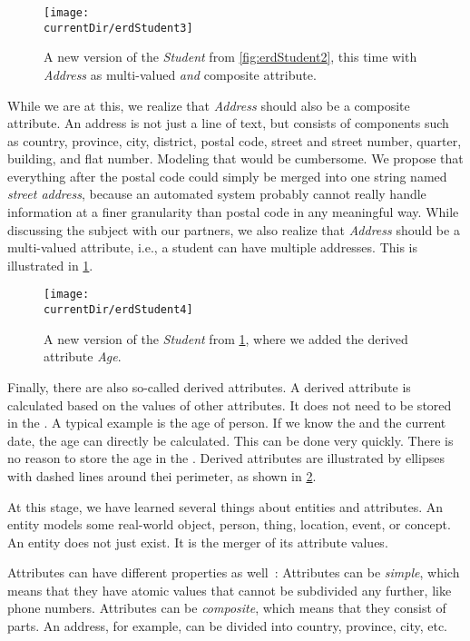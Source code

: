 \begin{figure}%
\centering%
\texttt{[image: \\currentDir/erdStudent3]}%
\caption{A new version of the \emph{Student}  from \cref{fig:erdStudent2}, this time with \emph{Address} as multi-valued \emph{and} composite attribute.}%
\label{fig:erdStudent3}%
\end{figure}%
%
While we are at this, we realize that \emph{Address} should also be a composite attribute.
An address is not just a line of text, but consists of components such as country, province, city, district, postal code, street and street number, quarter, building, and flat number.
Modeling that would be cumbersome.
We propose that everything after the postal code could simply be merged into one string named \emph{street address}, because an automated system probably cannot really handle information at a finer granularity than postal code in any meaningful way.
While discussing the subject with our partners, we also realize that \emph{Address} should be a multi-valued attribute, i.e., a student can have multiple addresses.
This is illustrated in \cref{fig:erdStudent3}.

\begin{figure}%
\centering%
\texttt{[image: \\currentDir/erdStudent4]}%
\caption{A new version of the \emph{Student}  from \cref{fig:erdStudent3}, where we added the derived attribute \emph{Age}.}%
\label{fig:erdStudent4}%
\end{figure}%

Finally, there are also so-called derived attributes.
A derived attribute is calculated based on the values of other attributes.
It does not need to be stored in the \db.
A typical example is the age of person.
If we know the  and the current date, the age can directly be calculated.
This can be done very quickly.
There is no reason to store the age in the \db.
Derived attributes are illustrated by ellipses with dashed lines around thei perimeter, as shown in \cref{fig:erdStudent4}.

At this stage, we have learned several things about entities and attributes.
An entity models some real-world object, person, thing, location, event, or concept.
An entity does not just exist.
It is the merger of its attribute values.

Attributes can have different properties as well~\cite{S2024D:CDMERDE}:
Attributes can be \emph{simple}, which means that they have atomic values that cannot be subdivided any further, like phone numbers.
Attributes can be \emph{composite}, which means that they consist of parts.
An address, for example, can be divided into country, province, city, etc.

